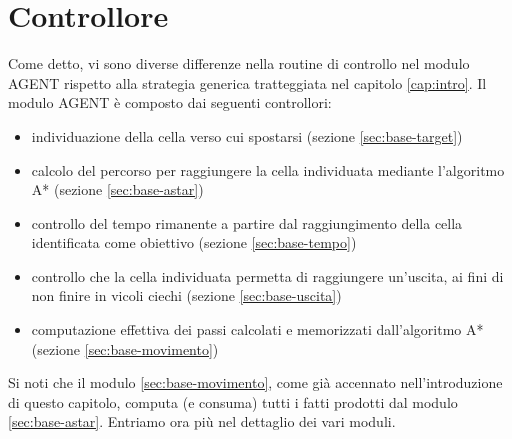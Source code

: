 \section{Controllore} \label{sec:base-controllore}
Come detto, vi sono diverse differenze nella routine di controllo nel modulo AGENT rispetto alla strategia generica tratteggiata nel capitolo \ref{cap:intro}. Il modulo AGENT è composto dai seguenti controllori:
\begin{itemize}
	\item individuazione della cella verso cui spostarsi (sezione \ref{sec:base-target})
	\item calcolo del percorso per raggiungere la cella individuata mediante l'algoritmo A* (sezione \ref{sec:base-astar})
	\item controllo del tempo rimanente a partire dal raggiungimento della cella identificata come obiettivo (sezione \ref{sec:base-tempo})
	\item controllo che la cella individuata permetta di raggiungere un'uscita, ai fini di non finire in vicoli ciechi (sezione \ref{sec:base-uscita})
	\item computazione effettiva dei passi calcolati e memorizzati dall'algoritmo A* (sezione \ref{sec:base-movimento})
\end{itemize}
Si noti che il modulo \ref{sec:base-movimento}, come già accennato nell'introduzione di questo capitolo, computa (e consuma) tutti i fatti prodotti dal modulo \ref{sec:base-astar}. Entriamo ora più nel dettaglio dei vari moduli.


